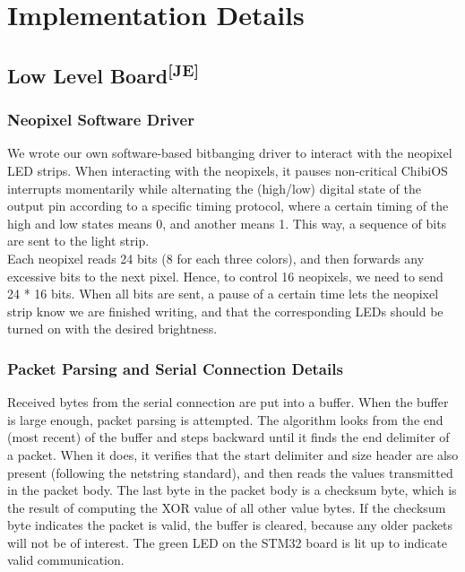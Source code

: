 \chapter{Implementation Details}
\section[Low Level Board]{Low Level Board\textsuperscript{[JE]}}
\subsection{Neopixel Software Driver}
We wrote our own software-based bitbanging driver to interact with the neopixel
LED strips. When interacting with the neopixels, it pauses non-critical ChibiOS
interrupts momentarily while alternating the (high/low) digital state of the
output pin according to a specific timing protocol, where a certain timing of
the high and low states means 0, and another means 1. This way, a sequence of
bits are sent to the light strip.\\

\noindent
Each neopixel reads 24 bits (8 for each three colors), and then forwards any
excessive bits to the next pixel. Hence, to control 16 neopixels, we need to
send 24 * 16 bits. When all bits are sent, a pause of a certain time lets the
neopixel strip know we are finished writing, and that the corresponding LEDs
should be turned on with the desired brightness.

\subsection{Packet Parsing and Serial Connection Details}
Received bytes from the serial connection are put into a buffer. When the buffer
is large enough, packet parsing is attempted. The algorithm looks from the end
(most recent) of the buffer and steps backward until it finds the end delimiter
of a packet. When it does, it verifies that the start delimiter and size header
are also present (following the netstring standard), and then reads the values
transmitted in the packet body. The last byte in the packet body is a checksum
byte, which is the result of computing the XOR value of all other value bytes.
If the checksum byte indicates the packet is valid, the buffer is cleared,
because any older packets will not be of interest. The green LED on the STM32
board is lit up to indicate valid communication.\\

